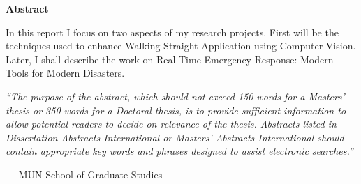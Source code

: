 \begin{center}
\textbf{\large Abstract}
\end{center}

In this report I focus on two aspects of my research projects. First will be the techniques used to enhance Walking Straight Application using Computer Vision. Later, I shall describe the work on Real-Time Emergency Response: Modern Tools for Modern Disasters.

\vspace{1cm}

\emph{``The purpose of the abstract, which should not exceed 150 words for
a Masters' thesis or 350 words for a Doctoral thesis, is to provide
sufficient information to allow potential readers to decide on relevance
of the thesis. Abstracts listed in Dissertation Abstracts International
or Masters' Abstracts International should contain appropriate key
words and phrases designed to assist electronic searches.''}

\hfill --- MUN School of Graduate Studies
